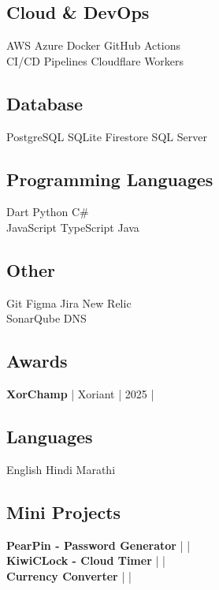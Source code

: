 \documentclass[]{deedy-resume-reversed}
\begin{document}
\begin{minipage}[t]{0.33\textwidth}
\subsection{Cloud \& DevOps}
AWS \textbullet Azure \textbullet Docker \textbullet GitHub Actions \\
CI/CD Pipelines \textbullet Cloudflare Workers \\
\sectionsep

\subsection{Database}
PostgreSQL \textbullet SQLite \textbullet Firestore \textbullet SQL Server \\
\sectionsep

\subsection{Programming Languages}
Dart \textbullet Python \textbullet C\# \\
JavaScript \textbullet TypeScript \textbullet Java \\ 
\sectionsep

\subsection{Other}
Git \textbullet Figma \textbullet Jira \textbullet New Relic\\
SonarQube \textbullet DNS \\
\sectionsep

\subsection{Awards}
\textbf{XorChamp} | Xoriant | 2025  | 
\href{https://github.com/sunnydodti/resume/blob/main/awards/XorChamp%20-%20Sunny%20Dodti.pdf}{\faExternalLink } 
\sectionsep

\subsection{Languages}
English \textbullet Hindi \textbullet Marathi \\
\sectionsep

\subsection{Mini Projects}

\textbf{PearPin - Password Generator} | \href{https://github.com/sunnydodti/pearpin}{\faGithub} | \href{https://pearpin.persist.site}{\faExternalLink} \\

\textbf{KiwiCLock - Cloud Timer} | \href{https://github.com/sunnydodti/kiwiclock}{\faGithub} | \href{https://kiwiclock.persist.site}{\faExternalLink} \\

\textbf{Currency Converter} | \href{https://github.com/sunnydodti/currency_converter}{\faGithub} | \href{https://sunnydodti.github.io/currency_converter}{\faExternalLink}
\sectionsep

\end{minipage}
\end{document}
